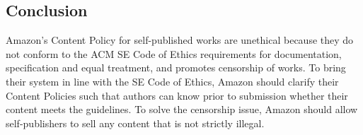 \documentclass[11pt]{article}
\begin{document}
\begin{multicols}{2}


\section{Conclusion}
Amazon's Content Policy for self-published works are unethical because they do not conform to the ACM SE Code of Ethics requirements for documentation, specification and equal treatment, and promotes censorship of works.  To bring their system in line with the SE Code of Ethics, Amazon should clarify their Content Policies such that authors can know prior to submission whether their content meets the guidelines.  To solve the censorship issue, Amazon should allow self-publishers to sell any content that is not strictly illegal.

\end{multicols}
\newpage





\end{document}
